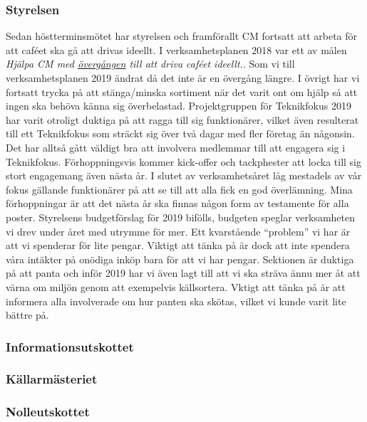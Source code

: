 \documentclass[../_main/handlingar.tex]{subfiles}
\begin{document}

\subsubsection*{Styrelsen}
Sedan höstterminsmötet har styrelsen och framförallt CM fortsatt att arbeta för att caféet ska gå att drivas ideellt. I verksamhetsplanen 2018 var ett av målen \textit{Hjälpa CM med \underline{övergången} till att driva caféet ideellt.}. Som vi till verksamhetsplanen 2019 ändrat då det inte är en övergång längre. I övrigt har vi fortsatt trycka på att stänga/minska sortiment när det varit ont om hjälp så att ingen ska behöva känna sig överbelastad.
Projektgruppen för Teknikfokus 2019 har varit otroligt duktiga på att ragga till sig funktionärer, vilket även resulterat till ett Teknikfokus som sträckt sig över två dagar med fler företag än någonsin. Det har alltså gått väldigt bra att involvera medlemmar till att engagera sig i Teknikfokus. Förhoppningsvis kommer kick-offer och tackphester att locka till sig stort engagemang även nästa år.
I slutet av verksamhetsåret låg mestadels av vår fokus gällande funktionärer på att se till att alla fick en god överlämning. Mina förhoppningar är att det nästa år ska finnas någon form av testamente för alla poster.
Styrelsens budgetförslag för 2019 bifölls, budgeten speglar verksamheten vi drev under året med utrymme för mer. Ett kvarstående ``problem'' vi har är att vi spenderar för lite pengar. Viktigt att tänka på är dock att inte spendera våra intäkter på onödiga inköp bara för att vi har pengar.
Sektionen är duktiga på att panta och inför 2019 har vi även lagt till att vi ska sträva ännu mer åt att värna om miljön genom att exempelvis källsortera. Vktigt att tänka på är att informera alla involverade om hur panten ska skötas, vilket vi kunde varit lite bättre på.  

\subsubsection*{Informationsutskottet}

\subsubsection*{Källarmästeriet}

\subsubsection*{Nolleutskottet}
\end{document}
